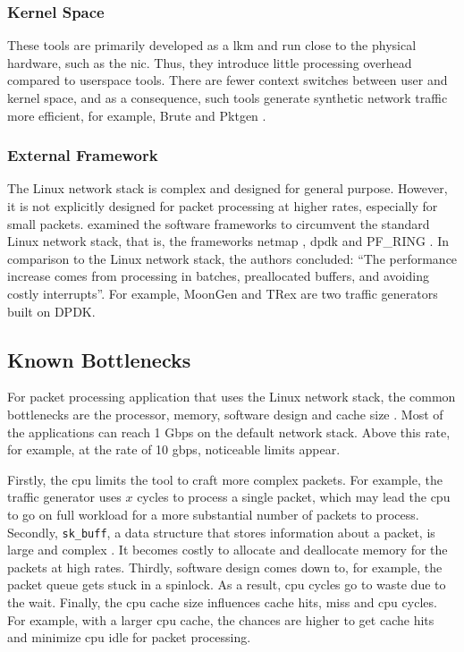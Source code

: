 \subsubsection{Kernel Space}
These tools are primarily developed as a \gls{lkm} and run close to the physical hardware, such as the \gls{nic}.
Thus, they introduce little processing overhead compared to userspace tools.
There are fewer context switches between user and kernel space, and as a consequence, such tools generate synthetic network traffic more efficient, for example, Brute \cite{bonelli2005brute} and Pktgen \cite{turull2016pktgen}.

\subsubsection{External Framework}
The Linux network stack is complex and designed for general purpose.
However, it is not explicitly designed for packet processing at higher rates, especially for small packets.
\citet{gallenmuller2015comparison} examined the software frameworks to circumvent the standard Linux network stack, that is, the frameworks netmap \cite{infoietu32:online}, \acrshort{dpdk} \cite{DPDK35:online} and PF\_RING \cite{PFRINGn1:online}.
In comparison to the Linux network stack, the authors concluded: ``The performance increase comes from processing in batches, preallocated buffers, and avoiding costly interrupts''.
For example, MoonGen \cite{emmericp44:online} and TRex \cite{TRex62:online} are two traffic generators built on DPDK.

\subsection{Known Bottlenecks}
For packet processing application that uses the Linux network stack, the common bottlenecks are the processor, memory, software design and cache size \cite{raumer2015performance, emmerich2015assessing, braun2010comparing, gallenmuller2015comparison}.
Most of the applications can reach 1 Gbps on the default network stack.
Above this rate, for example, at the rate of 10 \acrshort{gbps}, noticeable limits appear.

\skippara Firstly, the \acrshort{cpu} limits the tool to craft more complex packets.
For example, the traffic generator uses $x$ cycles to process a single packet, which may lead the \acrshort{cpu} to go on full workload for a more substantial number of packets to process.
Secondly, \texttt{sk\_buff}, a data structure that stores information about a packet, is large and complex \cite{networki54:online}.
It becomes costly to allocate and deallocate memory for the packets at high rates.
Thirdly, software design comes down to, for example, the packet queue gets stuck in a spinlock.
As a result, \acrshort{cpu} cycles go to waste due to the wait.
Finally, the \acrshort{cpu} cache size influences cache hits, miss and \acrshort{cpu} cycles.
For example, with a larger \acrshort{cpu} cache, the chances are higher to get cache hits and minimize \acrshort{cpu} idle for packet processing.


